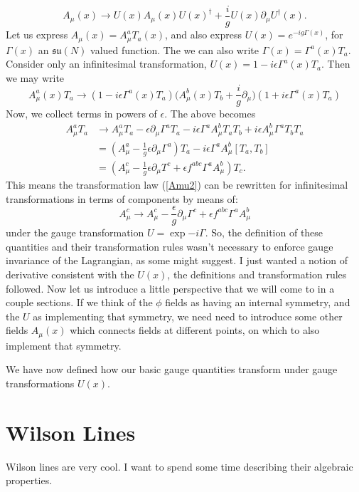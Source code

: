 \documentclass[main.tex]{subfiles}
\begin{document}
\begin{equation} \label{Amu2}
\boxed{A_\mu (x) \to U (x) A_\mu (x) U(x)^\dagger + \frac{i}{g} U(x) \partial_\mu U^\dagger (x).}
\end{equation}
Let us express $A_\mu (x) = A_\mu^a T_a (x)$, and also express $U(x) = e^{- i g \Gamma(x)}$, for $\Gamma(x)$ an $\mathfrak{su}(N)$ valued function. The we can also write $\Gamma(x) = \Gamma^a(x) T_a$. Consider only an infinitesimal transformation, $U(x) = 1 - i \epsilon \Gamma^a (x) T_a$. Then we may write
\[
A_\mu^a (x) T_a \to 
(1 - i \epsilon \Gamma^a (x) T_a) \Big(
A_\mu^b (x) T_b + \frac{i}{g} \partial_\mu
\Big)
(1 + i \epsilon \Gamma^a (x) T_a)
\]
Now, we collect terms in powers of $\epsilon$. The above becomes
\begin{align*}
A_\mu^a T_a & \to A_\mu^a T_a - \epsilon \partial_\mu \Gamma^a T_a 
-i \epsilon \Gamma^a A_\mu^b T_a T_b 
+i \epsilon A_\mu^b \Gamma^a T_b T_a \\ & = 
(A_\mu^a - \frac{1}{g}\epsilon \partial_\mu \Gamma^a) T_a - i \epsilon \Gamma^a A_\mu^b [T_a,T_b]
\\ & = 
(A_\mu^c - \frac{1}{g} \epsilon \partial_\mu T^c + \epsilon f^{abc} \Gamma^a A_\mu^b)T_c.
\end{align*}
This means the transformation law (\ref{Amu2}) can be rewritten for infinitesimal transformations in terms of components by means of:
\begin{equation} \label{Amua}
\boxed{A_\mu^c \to A_\mu^c - \frac{\epsilon}{g} \partial_\mu \Gamma^c + \epsilon f^{abc} \Gamma^a A_\mu^b}
\end{equation}
under the gauge transformation $U = \exp{-i \Gamma}$.
So, the definition of these quantities and their transformation rules wasn't necessary to enforce gauge invariance of the Lagrangian, as some might suggest. I just wanted a notion of derivative consistent with the $U(x)$, the definitions and transformation rules followed. Now let us introduce a little perspective that we will come to in a couple sections. If we think of the $\phi$ fields as having an internal symmetry, and the $U$ as implementing that symmetry, we need need to introduce some other fields $A_\mu (x)$ which connects fields at different points, on which to also implement that symmetry. 

We have now defined how our basic gauge quantities transform under gauge transformations $U(x)$.

\section{Wilson Lines}
Wilson lines are very cool. I want to spend some time describing their algebraic properties.
\end{document}

